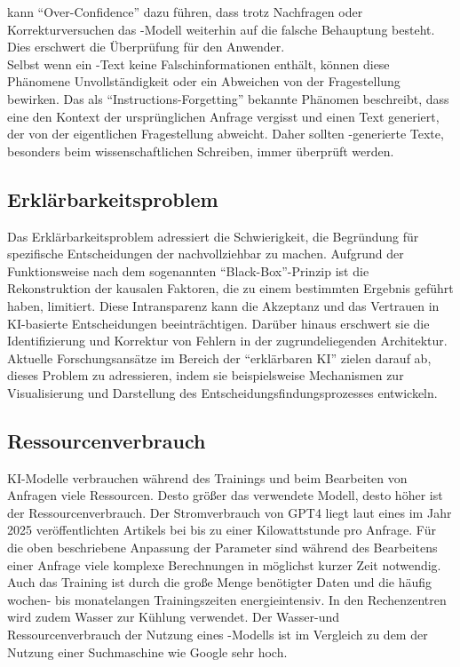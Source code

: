 \documentclass[../main.tex]{subfiles}
\begin{document}
kann "`Over-Confidence"' dazu führen, dass trotz Nachfragen oder Korrekturversuchen das -Modell weiterhin auf die falsche Behauptung besteht. Dies erschwert die 
Überprüfung für den Anwender.\cite{allgemHalluzinationen,softmax} \\
Selbst wenn ein -Text keine Falschinformationen enthält, können diese Phänomene Unvollständigkeit oder ein Abweichen von der Fragestellung bewirken. Das als 
"`Instructions-Forgetting"' bekannte Phänomen beschreibt, dass eine  den Kontext der ursprünglichen Anfrage vergisst und einen Text generiert, der von der 
eigentlichen Fragestellung abweicht. Daher sollten -generierte Texte, besonders beim wissenschaftlichen Schreiben, immer überprüft werden.\cite{allgemHalluzinationen}


\subsection{Erklärbarkeitsproblem}
\label{sec:erklärbarkeitsproblem}

Das Erklärbarkeitsproblem adressiert die Schwierigkeit, die Begründung für spezifische Entscheidungen der  nachvollziehbar zu machen. Aufgrund der Funktionsweise nach dem sogenannten 
"`Black-Box"'-Prinzip ist die Rekonstruktion der kausalen Faktoren, die zu einem bestimmten Ergebnis geführt haben, limitiert. Diese Intransparenz kann die Akzeptanz und das Vertrauen in 
KI-basierte Entscheidungen beeinträchtigen. Darüber hinaus erschwert sie die Identifizierung und Korrektur von Fehlern in der zugrundeliegenden Architektur. Aktuelle Forschungsansätze 
im Bereich der "`erklärbaren KI"' zielen darauf ab, dieses Problem zu adressieren, indem sie beispielsweise Mechanismen zur Visualisierung und Darstellung des 
Entscheidungsfindungsprozesses entwickeln.\cite{explainable}
 

\subsection{Ressourcenverbrauch}

KI-Modelle verbrauchen während des Trainings und beim Bearbeiten von Anfragen viele Ressourcen. Desto größer das verwendete Modell, desto höher ist der Ressourcenverbrauch. 
Der Stromverbrauch von GPT4 liegt laut eines im Jahr 2025 veröffentlichten Artikels bei bis zu einer Kilowattstunde pro Anfrage\cite{Energieverbrauch}. Für die oben beschriebene Anpassung der Parameter sind während des Bearbeitens einer Anfrage viele 
komplexe Berechnungen in möglichst kurzer Zeit notwendig. Auch das Training ist durch die große Menge benötigter Daten und die häufig wochen- bis monatelangen Trainingszeiten 
energieintensiv. In den Rechenzentren wird zudem Wasser zur Kühlung verwendet. Der Wasser-und Ressourcenverbrauch der Nutzung eines -Modells ist im Vergleich zu dem der Nutzung einer 
Suchmaschine wie Google sehr hoch\cite{KINachhaltigkeit}. 
\end{document}
